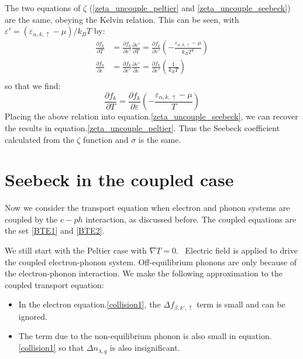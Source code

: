 \documentclass{article}
\newcommand{\pfrac}[2]{\frac{\partial #1}{\partial #2}}
\newcommand{\fbk}{f_{\beta,k',\uparrow}}
\newcommand{\nlq}{n_{\lambda,q}}
\newcommand{\ak}{\alpha,k,\uparrow}
\begin{document}
The two equations of $\zeta$ (\ref{zeta_uncouple_peltier} and \ref{zeta_uncouple_seebeck}) are the same, obeying the 
Kelvin relation. This can be seen, with $\varepsilon' = (\varepsilon_{\ak}-\mu)/k_B T$ by:
\begin{align}
    \pfrac{f_k}{T} &= \pfrac{f_k}{\varepsilon'} \pfrac{\varepsilon'}{T} = \pfrac{f_k}{\varepsilon'} \left( -\frac{\varepsilon_{\ak}-\mu}{k_B T^2} \right) \\
    \pfrac{f_k}{\varepsilon} &= \pfrac{f_k}{\varepsilon'} \pfrac{\varepsilon'}{\varepsilon} = \pfrac{f_k}{\varepsilon'} \left( \frac{1}{k_B T} \right) \\
\end{align}
so that we find:
\begin{equation}
    \pfrac{f_k}{T} = \pfrac{f_k}{\varepsilon} \left( -\frac{\varepsilon_{\ak}-\mu}{T} \right) \label{partial_relation}
\end{equation}
Placing the above relation into equation.\ref{zeta_uncouple_seebeck}, we can recover the results in equation.\ref{zeta_uncouple_peltier}. 
Thus the Seebeck coefficient calculated from the $\zeta$ function and $\sigma$ is the same.

\section{Seebeck in the coupled case}
Now we consider the transport equation when electron and phonon systems are coupled by the
$e-ph$ interaction, as discussed before. The coupled equations are the set \ref{BTE1} and \ref{BTE2}.

We still start with the Peltier case with $\nabla T = 0$. \
Electric field is applied to drive the coupled 
electron-phonon system. Off-equilibrium phonons are only because of the electron-phonon interaction.
We make the following approximation to the coupled transport equation:
\begin{itemize}
    \item In the electron equation.\ref{collision1}, the $\Delta\fbk$ term is small and can be ignored. 
    \item The term due to the non-equilibrium phonon is also small in equation.\ref{collision1} so that $\Delta\nlq$ is also insignificant.
\end{itemize}
\end{document}
